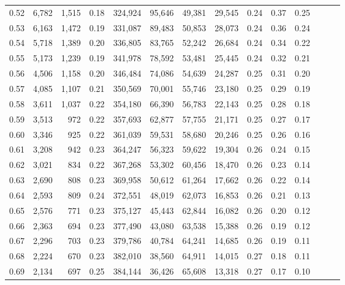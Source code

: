 \begin{tabular}{rrrrrrrrrrrrrr}
0.52 &   6,782 &  1,515 &  0.18 &  324,924 &   95,646 &  49,381 &  29,545 &  0.24 &  0.37 &      0.25 \\
0.53 &   6,163 &  1,472 &  0.19 &  331,087 &   89,483 &  50,853 &  28,073 &  0.24 &  0.36 &      0.24 \\
0.54 &   5,718 &  1,389 &  0.20 &  336,805 &   83,765 &  52,242 &  26,684 &  0.24 &  0.34 &      0.22 \\
0.55 &   5,173 &  1,239 &  0.19 &  341,978 &   78,592 &  53,481 &  25,445 &  0.24 &  0.32 &      0.21 \\
0.56 &   4,506 &  1,158 &  0.20 &  346,484 &   74,086 &  54,639 &  24,287 &  0.25 &  0.31 &      0.20 \\
0.57 &   4,085 &  1,107 &  0.21 &  350,569 &   70,001 &  55,746 &  23,180 &  0.25 &  0.29 &      0.19 \\
0.58 &   3,611 &  1,037 &  0.22 &  354,180 &   66,390 &  56,783 &  22,143 &  0.25 &  0.28 &      0.18 \\
0.59 &   3,513 &    972 &  0.22 &  357,693 &   62,877 &  57,755 &  21,171 &  0.25 &  0.27 &      0.17 \\
0.60 &   3,346 &    925 &  0.22 &  361,039 &   59,531 &  58,680 &  20,246 &  0.25 &  0.26 &      0.16 \\
0.61 &   3,208 &    942 &  0.23 &  364,247 &   56,323 &  59,622 &  19,304 &  0.26 &  0.24 &      0.15 \\
0.62 &   3,021 &    834 &  0.22 &  367,268 &   53,302 &  60,456 &  18,470 &  0.26 &  0.23 &      0.14 \\
0.63 &   2,690 &    808 &  0.23 &  369,958 &   50,612 &  61,264 &  17,662 &  0.26 &  0.22 &      0.14 \\
0.64 &   2,593 &    809 &  0.24 &  372,551 &   48,019 &  62,073 &  16,853 &  0.26 &  0.21 &      0.13 \\
0.65 &   2,576 &    771 &  0.23 &  375,127 &   45,443 &  62,844 &  16,082 &  0.26 &  0.20 &      0.12 \\
0.66 &   2,363 &    694 &  0.23 &  377,490 &   43,080 &  63,538 &  15,388 &  0.26 &  0.19 &      0.12 \\
0.67 &   2,296 &    703 &  0.23 &  379,786 &   40,784 &  64,241 &  14,685 &  0.26 &  0.19 &      0.11 \\
0.68 &   2,224 &    670 &  0.23 &  382,010 &   38,560 &  64,911 &  14,015 &  0.27 &  0.18 &      0.11 \\
0.69 &   2,134 &    697 &  0.25 &  384,144 &   36,426 &  65,608 &  13,318 &  0.27 &  0.17 &      0.10 \\

\end{tabular}

